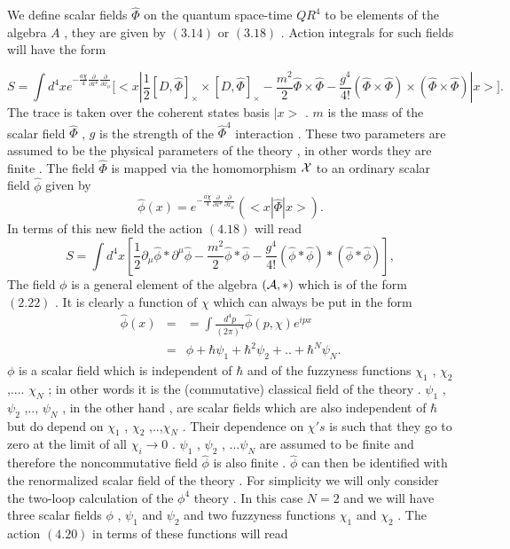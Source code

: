 \documentclass[a4paper,12pt]{article}
\begin{document}
 \vskip 5mm
\noindent

We define scalar fields $\hat{\Phi}$ on the quantum space-time
$QR^4$ to be elements of the algebra $A$ , they are given by
$(3.14)$ or $(3.18)$ . Action integrals for such fields will have
the form \cite{sachin}

\begin{equation}
S=\int d^4x
e^{-\frac{a{\chi}}{4}{\frac{\partial}{{\partial}x^{\mu}}}{\frac{\partial}{{\partial}x_{\mu}}}}\bigg[<x|\frac{1}{2}[D,\hat{\Phi}]_{\times}{\times}[D,\hat{\Phi}]_{\times}
- \frac{m^2}{2}{\hat{\Phi}}{\times}{\hat{\Phi}}
-\frac{g^4}{4!}({\hat{\Phi}}{\times}{\hat{\Phi}}){\times}({\hat{\Phi}}{\times}{\hat{\Phi}})|x>\bigg].
\end{equation}
The trace is taken over the coherent states basis $|x>$ .
 $m$ is the mass of the scalar field ${\hat{\Phi}}$ , $g$ is the strength of the ${\hat{\Phi}}^4$ interaction .
  These two parameters are assumed to be the physical parameters of the theory , in other words they are finite .
   The field ${\hat{\Phi}}$ is mapped via the homomorphism ${\cal X}$ to an ordinary scalar field $\hat{\phi}$ given by
\begin{equation}
\hat{\phi}(x)=e^{-\frac{a{\chi}}{4}{\frac{\partial}{{\partial}x^{\mu}}}{\frac{\partial}{{\partial}x_{\mu}}}}(<x|{\hat{\Phi}}|x>).
\end{equation}
In terms of this new field the action $(4.18)$ will read
\begin{equation}
S=\int d^4x
[\frac{1}{2}{\partial}_{\mu}{\hat{\phi}}*{\partial}^{\mu}{\hat{\phi}}
-\frac{m^2}{2}{\hat{\phi}}*{\hat{\phi}} -
\frac{g^4}{4!}({\hat{\phi}}*{\hat{\phi}})*({\hat{\phi}}*{\hat{\phi}})],
\end{equation}
The field ${\phi}$ is a general element of the algebra $({\cal
A},*)$ which is of the form $(2.22)$ . It is clearly a function of
${\chi}$ which can always be put in the form
\begin{eqnarray}
{\hat{\phi}}(x)&=&=\int \frac{d^4p}{(2{\pi})^4} {\hat{\phi}}(p,{\chi})e^{ipx}\nonumber\\
&=&{\phi} + {\hbar}{\psi}_1 +{\hbar}^2{\psi}_2 + ..+{\hbar}^N{\psi}_N.
\end{eqnarray}
${\phi}$ is a scalar field which is independent of ${\hbar}$ and
of the fuzzyness functions ${\chi}_1$ , ${\chi}_2$ ,.... ${\chi}_N$ ; in other words it is the (commutative) classical field of the theory . ${\psi}_1$ , ${\psi}_2$ ,..,
${\psi}_N$ , in the other hand , are scalar fields which are also
independent of ${\hbar}$ but do depend on 
${\chi}_1$ , ${\chi}_2$ ,..,${\chi}_N$ . Their dependence on ${\chi}'s$ is such that they go to
zero at the limit of all ${\chi}_i{\longrightarrow}0$ . ${\psi}_1$ , ${\psi}_2$ , ...${\psi}_N$ are assumed to be finite and therefore the noncommutative field ${\hat{\phi}}$ is also finite . ${\hat{\phi}}$ can then be identified with the renormalized scalar field of the theory . For simplicity we will only
consider the two-loop calculation of the ${\phi}^4$ theory . In
this case $N=2$ and we will have three scalar fields ${\phi}$ ,
${\psi}_1$ and ${\psi}_2$ and two fuzzyness functions ${\chi}_1$
and ${\chi}_2$ . The action $(4.20)$ in terms of these functions
will read
\end{document}
